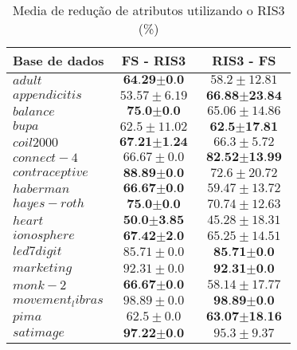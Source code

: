 \documentclass[a4paper, 12pt]{article}
\begin{document}
\begin{table}[h!]
  \begin{center}
    \caption{Media de redução de atributos utilizando o RIS3 (\%)}
    \label{tab:table9}
    \begin{tabular}{l|c|c}
      \textbf{Base de dados} &\textbf{FS - RIS3} & \textbf{RIS3 - FS}\\
        \hline
        $adult$ & $\textbf{64.29} \pm \textbf{0.0}$  & $58.2 \pm 12.81$ \\
        \hline
        $appendicitis$ & $53.57 \pm 6.19$  & $\textbf{66.88} \pm \textbf{23.84}$ \\
        \hline
        $balance$ & $\textbf{75.0} \pm \textbf{0.0}$  & $65.06 \pm 14.86$ \\
        \hline
        $bupa$ & $62.5 \pm 11.02$  & $\textbf{62.5} \pm \textbf{17.81}$ \\
        \hline
        $coil2000$ & $\textbf{67.21} \pm \textbf{1.24}$  & $66.3 \pm 5.72$ \\
        \hline
        $connect-4$ & $66.67 \pm 0.0$  & $\textbf{82.52} \pm \textbf{13.99}$ \\
        \hline
        $contraceptive$ & $\textbf{88.89} \pm \textbf{0.0}$  & $72.6 \pm 20.72$ \\
        \hline
        $haberman$ & $\textbf{66.67} \pm \textbf{0.0}$  & $59.47 \pm 13.72$ \\
        \hline
        $hayes-roth$ & $\textbf{75.0} \pm \textbf{0.0}$  & $70.74 \pm 12.63$ \\
        \hline
        $heart$ & $\textbf{50.0} \pm \textbf{3.85}$  & $45.28 \pm 18.31$ \\
        \hline
        $ionosphere$ & $\textbf{67.42} \pm \textbf{2.0}$  & $65.25 \pm 14.51$ \\
        \hline
        $led7digit$ & $85.71 \pm 0.0$  & $\textbf{85.71} \pm \textbf{0.0}$ \\
        \hline
        $marketing$ & $92.31 \pm 0.0$  & $\textbf{92.31} \pm \textbf{0.0}$ \\
        \hline
        $monk-2$ & $\textbf{66.67} \pm \textbf{0.0}$  & $58.14 \pm 17.77$ \\
        \hline
        $movement_libras$ & $98.89 \pm 0.0$  & $\textbf{98.89} \pm \textbf{0.0}$ \\
        \hline
        $pima$ & $62.5 \pm 0.0$  & $\textbf{63.07} \pm \textbf{18.16}$ \\
        \hline
        $satimage$ & $\textbf{97.22} \pm \textbf{0.0}$  & $95.3 \pm 9.37$ \\

\end{tabular}
\end{center}
\end{table}
\end{document}

